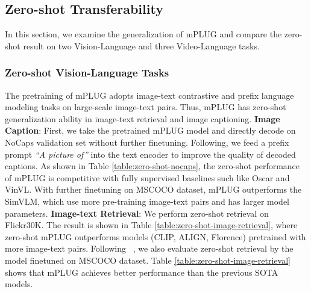 \documentclass[11pt]{article}
\newcommand{\modelname}{mPLUG }
\begin{document}
\subsection{Zero-shot Transferability}
In this section, we examine the generalization of \modelname and compare the zero-shot result on two Vision-Language and three Video-Language tasks.
\subsubsection{Zero-shot Vision-Language Tasks}
The pretraining of \modelname adopts image-text contrastive and prefix language modeling tasks on large-scale image-text pairs. Thus, \modelname has zero-shot generalization ability in image-text retrieval and image captioning. \textbf{Image Caption}: First, we take the pretrained \modelname model and directly decode on NoCaps validation set without further finetuning. Following\cite{wang2021simvlm,li2022blip}, we 
feed a prefix prompt \emph{``A picture of''} into the text encoder to improve the quality of decoded captions. As shown in Table \ref{table:zero-shot-nocaps}, the zero-shot performance of \modelname is competitive with fully supervised
baselines such like Oscar and VinVL. With further finetuning on MSCOCO dataset, \modelname outperforms the SimVLM, which use more pre-training image-text pairs and has larger model parameters. \textbf{Image-text Retrieval}: We perform zero-shot retrieval on Flickr30K. The result is shown in Table \ref{table:zero-shot-image-retrieval}, where zero-shot \modelname outperforms models (CLIP, ALIGN, Florence) pretrained with more image-text pairs. Following ~\cite{li2022blip}, we also evaluate zero-shot retrieval by the model finetuned on MSCOCO dataset. Table \ref{table:zero-shot-image-retrieval} shows that \modelname achieves better performance than the previous SOTA models.
\end{document}
